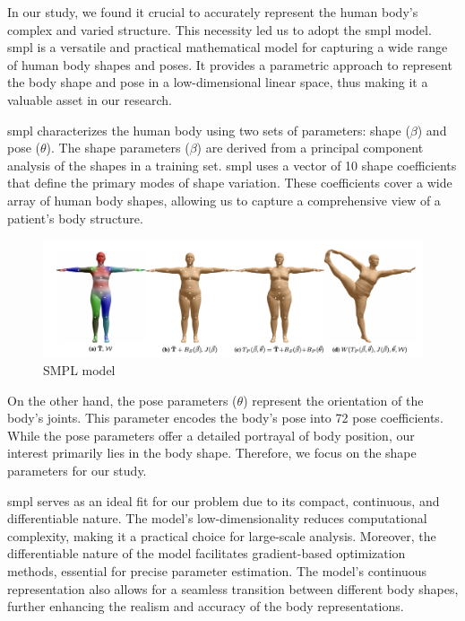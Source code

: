 In our study, we found it crucial to accurately represent the human body's
complex and varied structure. This necessity led us to adopt the \gls{smpl}
model. \gls{smpl} is a versatile and practical mathematical model for capturing
a wide range of human body shapes and poses. It provides a parametric approach
to represent the body shape and pose in a low-dimensional linear space, thus
making it a valuable asset in our research.

\gls{smpl} characterizes the human body using two sets of parameters: shape ($\beta$)
and pose ($\theta$). The shape parameters ($\beta$) are derived from a
principal component analysis of the shapes in a training set. \gls{smpl} uses a
vector of 10 shape coefficients that define the primary modes of shape
variation. These coefficients cover a wide array of human body shapes, allowing
us to capture a comprehensive view of a patient's body structure.

\begin{figure}[H]
	\centering
	\includegraphics[width=\textwidth]{files/SMPL_formulation}
	\caption{SMPL model \cite{meshcapade}}
	\label{fig:SMPL_formulation}
\end{figure}

On the other hand, the pose parameters ($\theta$) represent the orientation of
the body's joints. This parameter encodes the body's pose into 72 pose
coefficients. While the pose parameters offer a detailed portrayal of body
position, our interest primarily lies in the body shape. Therefore, we focus on
the shape parameters for our study.

\gls{smpl} serves as an ideal fit for our problem due to its compact, continuous, and
differentiable nature. The model's low-dimensionality reduces computational
complexity, making it a practical choice for large-scale analysis. Moreover,
the differentiable nature of the model facilitates gradient-based optimization
methods, essential for precise parameter estimation. The model's continuous
representation also allows for a seamless transition between different body
shapes, further enhancing the realism and accuracy of the body representations.

